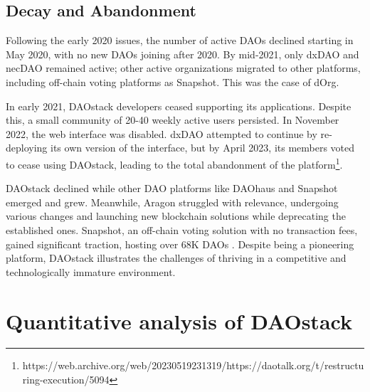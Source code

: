 \documentclass[10pt,lineno]{wlpeerj}
\begin{document}
\subsection{Decay and Abandonment}

Following the early 2020 issues, the number of active DAOs declined starting in May 2020, with no new DAOs joining after 2020. By mid-2021, only dxDAO and necDAO remained active; other active organizations migrated to other platforms, including off-chain voting platforms as Snapshot. This was the case of dOrg.


In early 2021, DAOstack developers ceased supporting its applications. Despite this, a small community of 20-40 weekly active users persisted. In November 2022, the web interface was disabled. dxDAO attempted to continue by re-deploying its own version of the interface, but by April 2023, its members voted to cease using DAOstack, leading to the total abandonment of the platform\footnote{https://web.archive.org/web/20230519231319/https://daotalk.org/t/restructuring-execution/5094}. %



DAOstack declined while other DAO platforms like DAOhaus and Snapshot emerged and grew. Meanwhile, Aragon struggled with relevance, undergoing various changes and launching new blockchain solutions while deprecating the established ones. Snapshot, an off-chain voting solution with no transaction fees, gained significant traction, hosting over 68K DAOs \citep{pena-calvin_concentration_2024}.
Despite being a pioneering platform, DAOstack illustrates the challenges of thriving in a competitive and technologically immature environment. 


\section{Quantitative analysis of DAOstack }
\label{sec:quant}
\end{document}
